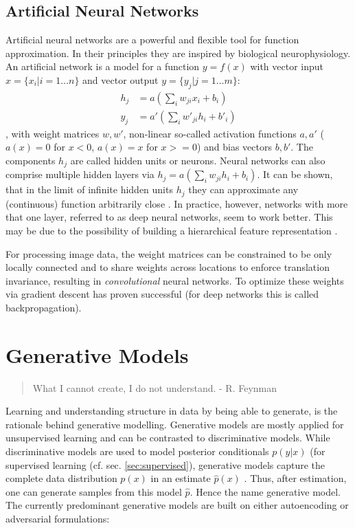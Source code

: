 	\subsection{Artificial Neural Networks}\label{sec:neuralnetworks}
		Artificial neural networks are a powerful and flexible tool for function approximation. In their principles they are inspired by biological neurophysiology. An artificial network is a model for a function $y = f(x)$ with vector input $x = \{ x_i | i = 1 \ldots n \}$ and vector output $y = \{ y_j | j = 1 \ldots m \}$:
		\begin{equation} \label{eq1}
			\begin{split}
				h_j & =  a (\sum_i w_{ji} x_i + b_i)  \\
				y_j & =  a' (\sum_i w'_{ji} h_i + b'_i)
			\end{split}
		\end{equation},
		with weight matrices $w, w'$, non-linear so-called activation functions $a, a'$ (\eg $a(x)=0$ for $x<0$, $a(x)=x$ for $x>=0$) and bias vectors $b, b'$.
		The components $h_j$ are called hidden units or neurons. Neural networks can also comprise multiple hidden layers via $h_j  =  a (\sum_i w_{ji} h_i + b_i)$.
		It can be shown, that in the limit of infinite hidden units $h_j$ they can approximate any (continuous) function arbitrarily close \cite{cybenko89approx, hornik91approx}.
		In practice, however, networks with more that one layer, referred to as deep neural networks, seem to work better. This may be due to the possibility of building a hierarchical feature representation \cite{zeiler14vis}.

		For processing image data, the weight matrices can be constrained to be only locally connected and to share weights across locations to enforce translation invariance, resulting in \textit{convolutional} neural networks.
		To optimize these weights via gradient descent has proven successful (for deep networks this is called backpropagation).

\section{Generative Models}\label{sec:genmodel}
	\begin{quote}
	    What I cannot create, I do not understand. - R. Feynman
	\end{quote}
	Learning and understanding structure in data by being able to generate, is the rationale behind generative modelling.
	Generative models are mostly applied for unsupervised learning and can be contrasted to discriminative models. While discriminative models are used to model posterior conditionals $p(y|x)$ (\eg for supervised learning (cf. sec. \ref{sec:supervised}), generative models capture the complete data distribution $p(x)$ in an estimate $\hat p(x)$ \cite{bishop06pattern}. Thus, after estimation, one can generate samples from this model $\hat p$. Hence the name generative model.
	The currently predominant generative models are built on either autoencoding or adversarial formulations:

